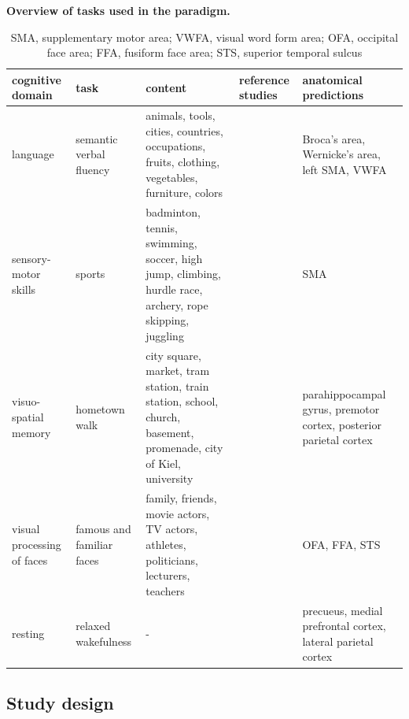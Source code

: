 \documentclass[fleqn,10pt]{SelfArx} %
\begin{document}
\begin{table}[ht]
			\scriptsize
			\centering
			\captionsetup{singlelinecheck = false, justification=justified}

	\caption{\bf Overview of tasks used in the paradigm.}
	\begin{tabularx}{\textwidth}{XXXXX}
		
		\hline
		{\bf cognitive domain} &	{\bf 	task} &	{\bf 	content} &	{\bf 	reference studies} &	{\bf 	anatomical predictions} \\
		\hline
		
		language &
		semantic verbal fluency &
		animals, tools, cities, countries, occupations, fruits, clothing, vegetables, furniture, colors &
		\citet{Woermann_2003} &
		Broca's area, Wernicke's area, left SMA, VWFA \\
		
		sensory-motor skills &
		sports &
		badminton, tennis, swimming, soccer, high jump, climbing, hurdle race, archery, rope skipping, juggling &
		\citet{Owen_2006} & 
		SMA \\
		
		visuo-spatial memory &
		hometown walk &
		city square, market, tram station, train station, school, church, basement, promenade, city of Kiel, university &
		\citet{Jokeit_2001, Owen_2006} &
		parahippocampal gyrus, premotor cortex, posterior parietal cortex \\
		
		visual processing of faces &
		famous and familiar faces &
		family, friends, movie actors, TV actors, athletes, politicians, lecturers, teachers &
		\citet{O_Craven_2000, Haxby_2000}	 &
		OFA, FFA, STS \\
		
		resting &
		relaxed wakefulness & 
		- &
		\citet{Fox_2005}
		 &
		precueus, medial prefrontal cortex, lateral parietal cortex \\
		
		\hline
	\end{tabularx}
	\caption*{SMA, supplementary motor area; VWFA, visual word form area; OFA, occipital face area; FFA, fusiform face area; STS, superior temporal sulcus}
	\label{tab:taskTab}
\end{table}

\subsection{Study design}
\end{document}
